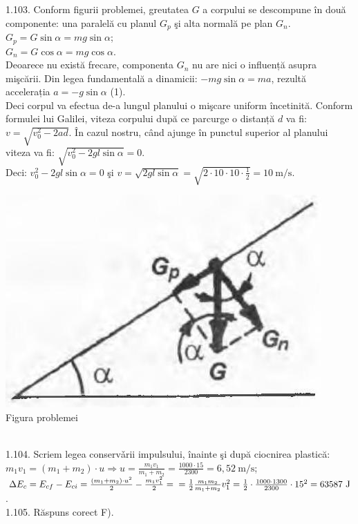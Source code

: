 1.103. Conform figurii problemei, greutatea $G$ a corpului se descompune în două componente: una paralelă cu planul $G_{p}$ şi alta normală pe plan $G_{n}$.\\ $G_{p}=G \sin \alpha=m g \sin \alpha$;\\ $G_{n}=G \cos \alpha=m g \cos \alpha$.\\ Deoarece nu există frecare, componenta $G_{n}$ nu are nici o influență asupra mişcării. Din legea fundamentală a dinamicii: $-m g \sin \alpha=m a$, rezultă accelerația $a=-g \sin \alpha$ (1).\\ Deci corpul va efectua de-a lungul planului o mişcare uniform încetinită. Conform formulei lui Galilei, viteza corpului după ce parcurge o distanță $d$ va fi: $v=\sqrt{v_{0}^{2}-2 a d}$. În cazul nostru, când ajunge în punctul superior al planului viteza va fi: $\sqrt{v_{0}^{2}-2 g l \sin \alpha}=0$.\\ Deci: $v_{0}^{2}-2 g l \sin \alpha=0$ şi $v=\sqrt{2 g l \sin \alpha}=\sqrt{2 \cdot 10 \cdot 10 \cdot \frac{1}{2}}=10 \mathrm{~m} / \mathrm{s}$.\\ \begin{center} \includegraphics[width=0.4\linewidth]{images/2025_07_01_5b3ff9fa0d508c8e9f17g-219(1)}\\ Figura problemei \end{center}\\ 

1.104. Scriem legea conservǎrii impulsului, înainte şi după ciocnirea plastică:\\ $m_{1} v_{1}=\left(m_{1}+m_{2}\right) \cdot u \Rightarrow u=\frac{m_{1} v_{1}}{m_{1}+m_{2}}=\frac{1000 \cdot 15}{2300}=6,52 \mathrm{~m} / \mathrm{s}$;\\ $\Delta E_{c}=E_{c f}-E_{c i}=\frac{\left(m_{1}+m_{2}\right) \cdot u^{2}}{2}-\frac{m_{1} v_{1}^{2}}{2}=\\ =\frac{1}{2} \frac{m_{1} m_{2}}{m_{1}+m_{2}} v_{1}^{2}=\frac{1}{2} \cdot \frac{1000 \cdot 1300}{2300} \cdot 15^{2}=63587 \mathrm{~J}$.\\

1.105. Răspuns corect F).\\


